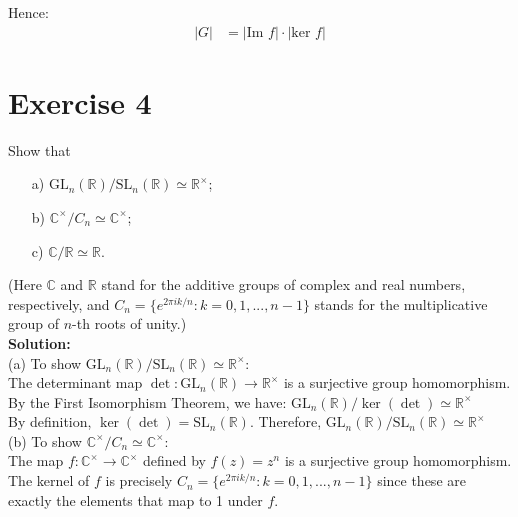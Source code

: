 \documentclass{article}
\begin{document}
Hence:
\begin{align*}
   |G| &= |\text{Im } f| \cdot |\text{ker } f|
\end{align*}

\newpage

\section*{Exercise 4}
Show that
\begin{itemize}
\item[a)] $\text{GL}_n(\mathbb{R})/\text{SL}_n(\mathbb{R}) \simeq \mathbb{R}^\times$;
\item[b)] $\mathbb{C}^\times/C_n \simeq \mathbb{C}^\times$;
\item[c)] $\mathbb{C}/\mathbb{R} \simeq \mathbb{R}$.
\end{itemize}
(Here $\mathbb{C}$ and $\mathbb{R}$ stand for the additive groups of complex and real numbers, respectively, and $C_n = \{e^{2\pi i k/n}: k = 0,1,...,n-1\}$ stands for the multiplicative group of $n$-th roots of unity.) \\

\textbf{Solution:} \\

(a) To show $\text{GL}_n(\mathbb{R})/\text{SL}_n(\mathbb{R}) \simeq \mathbb{R}^\times$: \\

The determinant map $\det: \text{GL}_n(\mathbb{R}) \to \mathbb{R}^\times$ is a surjective group homomorphism. \\

By the First Isomorphism Theorem, we have:
$\text{GL}_n(\mathbb{R})/\ker(\det) \simeq \mathbb{R}^\times$ \\

By definition, $\ker(\det) = \text{SL}_n(\mathbb{R})$.
Therefore, $\text{GL}_n(\mathbb{R})/\text{SL}_n(\mathbb{R}) \simeq \mathbb{R}^\times$ \\

(b) To show $\mathbb{C}^\times/C_n \simeq \mathbb{C}^\times$: \\

The map $f: \mathbb{C}^\times \to \mathbb{C}^\times$ defined by $f(z) = z^n$ is a surjective group homomorphism. \\

The kernel of $f$ is precisely $C_n = \{e^{2\pi i k/n}: k = 0,1,...,n-1\}$
since these are exactly the elements that map to 1 under $f$. \\
\end{document}
